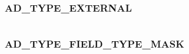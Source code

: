 \documentclass[letterpaper,10pt,english]{sphinxmanual}
\begin{document}
\begin{fulllineitems}
\label{appdev/refs/macros/ADDRTYPE_XNS:ADDRTYPE_XNS}
\end{fulllineitems}


\begin{tabulary}{\linewidth}{|L|L|}
\hline

 & 
\\
\hline\end{tabulary}



\subsubsection{AD\_TYPE\_EXTERNAL}
\label{appdev/refs/macros/AD_TYPE_EXTERNAL:ad-type-external-data}\label{appdev/refs/macros/AD_TYPE_EXTERNAL::doc}\label{appdev/refs/macros/AD_TYPE_EXTERNAL:ad-type-external}

\begin{fulllineitems}
\label{appdev/refs/macros/AD_TYPE_EXTERNAL:AD_TYPE_EXTERNAL}
\end{fulllineitems}


\begin{tabulary}{\linewidth}{|L|L|}
\hline

 & 
\\
\hline\end{tabulary}



\subsubsection{AD\_TYPE\_FIELD\_TYPE\_MASK}
\label{appdev/refs/macros/AD_TYPE_FIELD_TYPE_MASK:ad-type-field-type-mask}\label{appdev/refs/macros/AD_TYPE_FIELD_TYPE_MASK::doc}\label{appdev/refs/macros/AD_TYPE_FIELD_TYPE_MASK:ad-type-field-type-mask-data}

\begin{fulllineitems}
\label{appdev/refs/macros/AD_TYPE_FIELD_TYPE_MASK:AD_TYPE_FIELD_TYPE_MASK}
\end{fulllineitems}


\begin{tabulary}{\linewidth}{|L|L|}
\hline

 & 
\\
\hline\end{tabulary}
\end{document}
